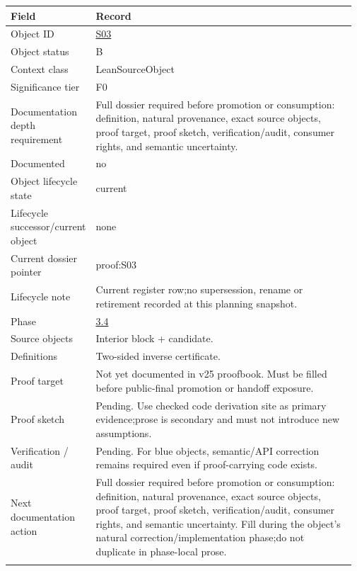 \begin{longtable}{L{0.16\linewidth} L{0.81\linewidth}}
\hline
\textbf{Field} & \textbf{Record}\\
\hline
Object ID & \hyperlink{object-row-S03}{S03}\\
\hline\addlinespace[0.20em]
Object status & B\\
\hline\addlinespace[0.20em]
Context class & LeanSourceObject\\
\hline\addlinespace[0.20em]
Significance tier & F0\\
\hline\addlinespace[0.20em]
Documentation depth requirement & Full dossier required before promotion or consumption: definition, natural provenance, exact source objects, proof target, proof sketch, verification/\allowbreak{}audit, consumer rights, and semantic uncertainty.\\
\hline\addlinespace[0.20em]
Documented & no\\
\hline\addlinespace[0.20em]
Object lifecycle state & current\\
\hline\addlinespace[0.20em]
Lifecycle successor/\allowbreak{}current object & none\\
\hline\addlinespace[0.20em]
Current dossier pointer & proof:S03\\
\hline\addlinespace[0.20em]
Lifecycle note & Current register row;\newline no supersession, rename or retirement recorded at this planning snapshot.\\
\hline\addlinespace[0.20em]
Phase & \hyperlink{phase-row-3-4}{3.4}\\
\hline\addlinespace[0.20em]
Source objects & Interior block + candidate.\\
\hline\addlinespace[0.20em]
Definitions & Two-sided inverse certificate.\\
\hline\addlinespace[0.20em]
Proof target & Not yet documented in v25 proofbook. Must be filled before public-final promotion or handoff exposure.\\
\hline\addlinespace[0.20em]
Proof sketch & Pending. Use checked code derivation site as primary evidence;\newline prose is secondary and must not introduce new assumptions.\\
\hline\addlinespace[0.20em]
Verification /\allowbreak{} audit & Pending. For blue objects, semantic/\allowbreak{}API correction remains required even if proof-carrying code exists.\\
\hline\addlinespace[0.20em]
Next documentation action & Full dossier required before promotion or consumption: definition, natural provenance, exact source objects, proof target, proof sketch, verification/\allowbreak{}audit, consumer rights, and semantic uncertainty. Fill during the object's natural correction/\allowbreak{}implementation phase;\newline do not duplicate in phase-local prose.\\
\hline\addlinespace[0.20em]
\end{longtable}
